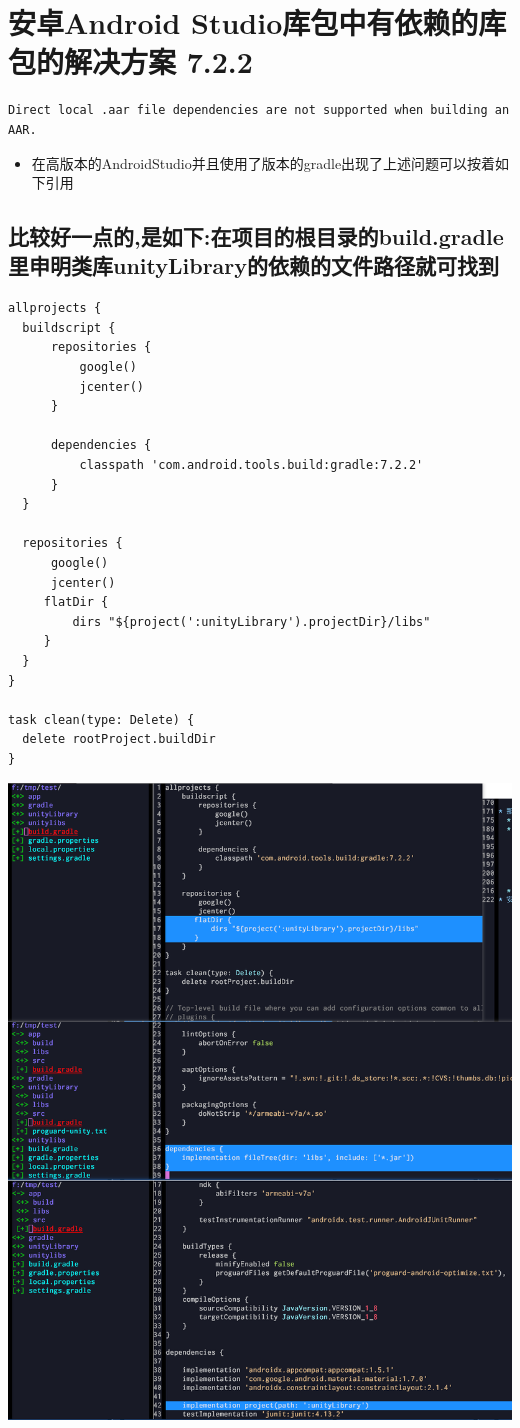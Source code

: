 \documentclass[9pt, b5paper]{article}
\begin{document}
\section{安卓Android Studio库包中有依赖的库包的解决方案 7.2.2}
\label{sec-8}
\begin{verbatim}
Direct local .aar file dependencies are not supported when building an AAR.
\end{verbatim}
\begin{itemize}
\item 在高版本的AndroidStudio并且使用了版本的gradle出现了上述问题可以按着如下引用
\end{itemize}
\subsection{比较好一点的,是如下:在项目的根目录的build.gradle里申明类库unityLibrary的依赖的文件路径就可找到}
\label{sec-8-1}
\begin{verbatim}
allprojects {
  buildscript {
      repositories {
          google()
          jcenter()
      }

      dependencies {
          classpath 'com.android.tools.build:gradle:7.2.2'
      }
  }

  repositories {
      google()
      jcenter()
     flatDir {
         dirs "${project(':unityLibrary').projectDir}/libs"
     }
  }
}

task clean(type: Delete) {
  delete rootProject.buildDir
}
\end{verbatim}

\includegraphics[width=.9\linewidth]{./pic/unityToAndroid_20221125_144439.png}
\end{document}
